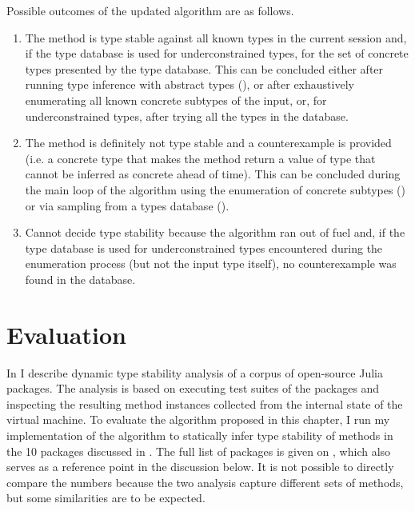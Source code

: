 Possible outcomes of the updated algorithm are as follows.
\begin{enumerate}

  \item The method is type stable against all known types in the current session
  and, if the type database is used for underconstrained types,
  for the set of concrete types presented by the type database. 
  This can be concluded either after
  running type inference with abstract types
  (), or after exhaustively enumerating all
  known concrete subtypes of the input, or,
  for underconstrained types, after trying all the types in the database.

  \item The method is definitely not type stable and a counterexample is provided
  (i.e. a
  concrete type that makes the method return a value of type that cannot be
  inferred as concrete ahead of time). This can be concluded during the main
  loop of the algorithm using the enumeration of concrete subtypes
  () or via
  sampling from a types database ().

  \item
  Cannot decide type stability because the algorithm ran out of fuel and,
  if the type database is used for underconstrained types encountered during
  the enumeration process (but not the input type itself), no
  counterexample was found in the database. %
\end{enumerate}


\section{Evaluation}%
\label{sec:approx:eval}

In  I describe dynamic type stability analysis of a
corpus of open-source Julia packages. The analysis is based on executing test
suites of the packages and inspecting the resulting method instances collected
from the internal state of the virtual machine. To evaluate the algorithm
proposed in this chapter, I run my implementation of the algorithm to statically
infer type stability of methods in the 10 packages discussed in
. The full list of packages is given on
, which also serves as a reference
point in the discussion below.
It is not possible to directly compare the numbers because the
two analysis capture different sets of methods, but some similarities are to be
expected.


